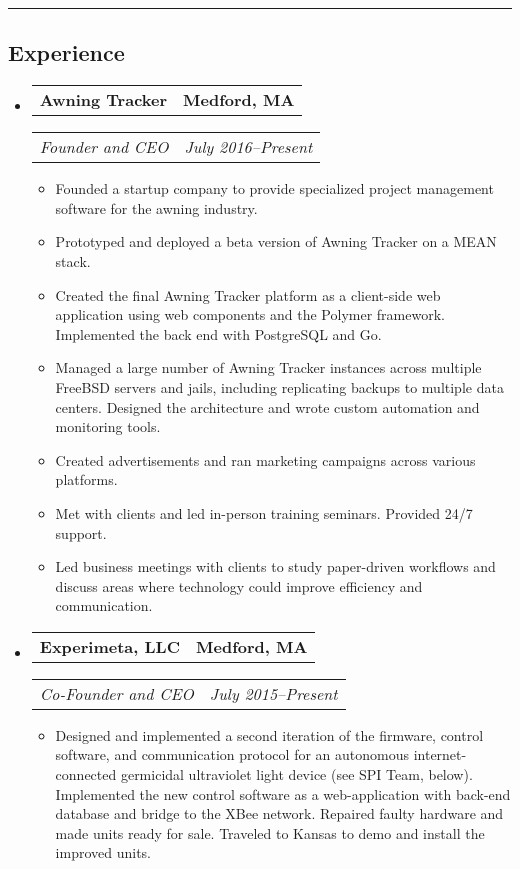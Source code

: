 \documentclass[10pt,letterpaper]{article}
\newcommand{\headerrow}[2]{%
    \begin{tabularx}{\linewidth}{Xr}
	    #1 & #2 \\
    \end{tabularx}
}
\begin{document}
\hrule
\vspace{-0.4em}
\subsection*{Experience}
\begin{itemize}
	\parskip=0.1em

	\item
	\headerrow{\textbf{Awning Tracker}}{\textbf{Medford, MA}}
	\headerrow{\textit{Founder and CEO}}{\textit{July 2016--Present}}
	\begin{itemize}
        \item Founded a startup company to provide specialized project
            management software for the awning industry.

        \item Prototyped and deployed a beta version of Awning Tracker on a
            MEAN stack.

        \item Created the final Awning Tracker platform as a client-side web
            application using web components and the Polymer framework.
            Implemented the back end with PostgreSQL and Go.

        \item Managed a large number of Awning Tracker instances across
            multiple FreeBSD servers and jails, including replicating backups
            to multiple data centers.  Designed the architecture and wrote
            custom automation and monitoring tools.

        \item Created advertisements and ran marketing campaigns across various
            platforms.

        \item Met with clients and led in-person training seminars.  Provided
            24/7 support.

        \item Led business meetings with clients to study paper-driven
            workflows and discuss areas where technology could improve
            efficiency and communication.
	\end{itemize}

    \item
    \headerrow{\textbf{Experimeta, LLC}}{\textbf{Medford, MA}}
    \headerrow{\textit{Co-Founder and CEO}}{\textit{July 2015--Present}}
    \begin{itemize}
        \item Designed and implemented a second iteration of the firmware,
            control software, and communication protocol for an autonomous
            internet-connected germicidal ultraviolet light device (see SPI
            Team, below).  Implemented the new control software as a
            web-application with back-end database and bridge to the XBee
            network.  Repaired faulty hardware and made units ready for sale.
            Traveled to Kansas to demo and install the improved units.
    \end{itemize}


\end{itemize}
\end{document}
